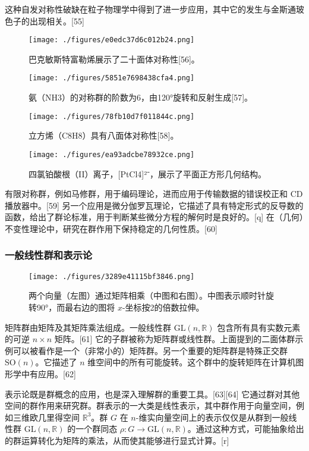 这种自发对称性破缺在粒子物理学中得到了进一步应用，其中它的发生与金斯通玻色子的出现相关。[55]
\begin{figure}[ht]
\centering
\texttt{[image: ./figures/e0edc37d6c012b24.png]}
\caption{巴克敏斯特富勒烯展示了二十面体对称性[56]。} \label{fig_GroupM_8}
\end{figure}
\begin{figure}[ht]
\centering
\texttt{[image: ./figures/5851e7698438cfa4.png]}
\caption{氨（NH3）的对称群的阶数为6，由120°旋转和反射生成[57]。} \label{fig_GroupM_9}
\end{figure}
\begin{figure}[ht]
\centering
\texttt{[image: ./figures/78fb10d7f011844c.png]}
\caption{立方烯（C8H8）具有八面体对称性[58]。} \label{fig_GroupM_10}
\end{figure}
\begin{figure}[ht]
\centering
\texttt{[image: ./figures/ea93adcbe78932ce.png]}
\caption{四氯铂酸根（II）离子，[PtCl4]²⁻，展示了平面正方形几何结构。} \label{fig_GroupM_11}
\end{figure}
有限对称群，例如马修群，用于编码理论，进而应用于传输数据的错误校正和 CD 播放器中。[59] 另一个应用是微分伽罗瓦理论，它描述了具有特定形式的反导数的函数，给出了群论标准，用于判断某些微分方程的解何时是良好的。[q] 在（几何）不变性理论中，研究在群作用下保持稳定的几何性质。[60]
\subsubsection{一般线性群和表示论}
\begin{figure}[ht]
\centering
\texttt{[image: ./figures/3289e41115bf3846.png]}
\caption{两个向量（左图）通过矩阵相乘（中图和右图）。中图表示顺时针旋转90°，而最右边的图将 \(x\)-坐标按2的倍数拉伸。} \label{fig_GroupM_12}
\end{figure}
矩阵群由矩阵及其矩阵乘法组成。一般线性群 \(\mathrm{GL}(n, \mathbb{R})\) 包含所有具有实数元素的可逆 \(n \times n\) 矩阵。[61] 它的子群被称为矩阵群或线性群。上面提到的二面体群示例可以被看作是一个（非常小的）矩阵群。另一个重要的矩阵群是特殊正交群 \(\mathrm{SO}(n)\)。它描述了 \(n\) 维空间中的所有可能旋转。这个群中的旋转矩阵在计算机图形学中有应用。[62]

表示论既是群概念的应用，也是深入理解群的重要工具。[63][64] 它通过群对其他空间的群作用来研究群。群表示的一大类是线性表示，其中群作用于向量空间，例如三维欧几里得空间 \(\mathbb{R}^3\)。群 \(G\) 在 \(n\)-维实向量空间上的表示仅仅是从群到一般线性群 \(\mathrm{GL}(n, \mathbb{R})\) 的一个群同态 \(\rho: G \to \mathrm{GL}(n, \mathbb{R})\)。通过这种方式，可能抽象给出的群运算转化为矩阵的乘法，从而使其能够进行显式计算。[r]

